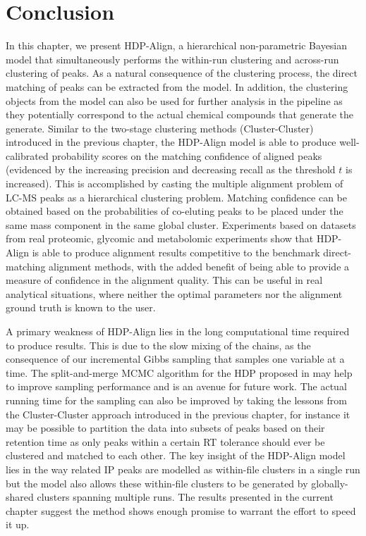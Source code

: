 \section{Conclusion}

\label{sec:conc}

In this chapter, we present HDP-Align, a hierarchical non-parametric Bayesian model that simultaneously performs the within-run clustering and across-run clustering of peaks. As a natural consequence of the clustering process, the direct matching of peaks can be extracted from the model. In addition, the clustering objects from the model can also be used for further analysis in the pipeline as they potentially correspond to the actual chemical compounds that generate the generate. Similar to the two-stage clustering methods (Cluster-Cluster) introduced in the previous chapter, the HDP-Align model is able to produce well-calibrated probability scores on the matching confidence of aligned peaks (evidenced by the increasing precision and decreasing recall as the threshold $t$ is increased). This is accomplished by casting the multiple alignment problem of LC-MS peaks as a hierarchical clustering problem. Matching confidence can be obtained based on the probabilities of co-eluting peaks to be placed under the same mass component in the same global cluster. Experiments based on datasets from real proteomic, glycomic and metabolomic experiments show that HDP-Align is able to produce alignment results competitive to the benchmark direct-matching alignment methods, with the added benefit of being able to provide a measure of confidence in the alignment quality. This can be useful in real analytical situations, where neither the optimal parameters nor the alignment ground truth is known to the user.

A primary weakness of HDP-Align lies in the long computational time required to produce results. This is due to the slow mixing of the chains, as the consequence of our incremental Gibbs sampling that samples one variable at a time. The split-and-merge MCMC algorithm for the HDP proposed in \cite{Wang2012} may help to improve sampling performance and is an avenue for future work. The actual running time for the sampling can also be improved by taking the lessons from the Cluster-Cluster approach introduced in the previous chapter, for instance it may be possible to partition the data into subsets of peaks based on their retention time as only peaks within a certain RT tolerance should ever be clustered and matched to each other. The key insight of the HDP-Align model lies in the way related IP peaks are modelled as within-file clusters in a single run but the model also allows these within-file clusters to be generated by globally-shared clusters spanning multiple runs. The results presented in the current chapter suggest the method shows enough promise to warrant the effort to speed it up. 

